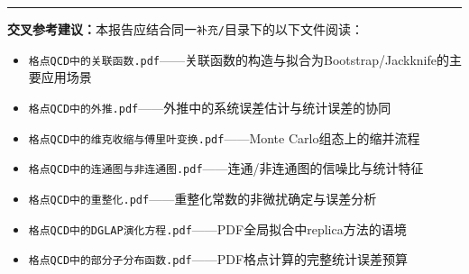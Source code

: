 \documentclass[12pt,a4paper]{ctexart}
\theoremstyle{definition}
\begin{document}
\vspace{0.5cm}
\noindent\rule{\textwidth}{0.5pt}
\small
\textbf{交叉参考建议：}本报告应结合同一\texttt{补充/}目录下的以下文件阅读：
\begin{itemize}[nosep]
    \item \texttt{格点QCD中的关联函数.pdf}——关联函数的构造与拟合为Bootstrap/Jackknife的主要应用场景
    \item \texttt{格点QCD中的外推.pdf}——外推中的系统误差估计与统计误差的协同
    \item \texttt{格点QCD中的维克收缩与傅里叶变换.pdf}——Monte Carlo组态上的缩并流程
    \item \texttt{格点QCD中的连通图与非连通图.pdf}——连通/非连通图的信噪比与统计特征
    \item \texttt{格点QCD中的重整化.pdf}——重整化常数的非微扰确定与误差分析
    \item \texttt{格点QCD中的DGLAP演化方程.pdf}——PDF全局拟合中replica方法的语境
    \item \texttt{格点QCD中的部分子分布函数.pdf}——PDF格点计算的完整统计误差预算
\end{itemize}
\end{document}
